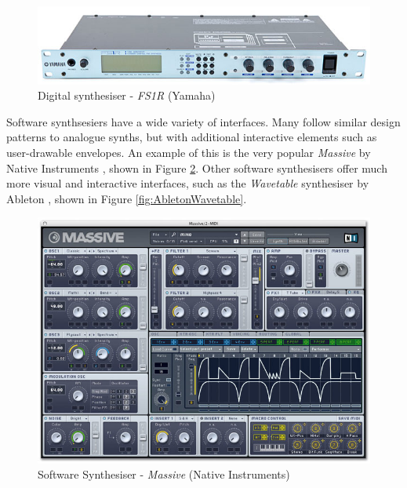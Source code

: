 \documentclass[11pt, oneside]{report}   	%
\begin{document}
%
\begin{figure}[h] 
	\centering
	\includegraphics[width = 6in]{yamaha_fs1r.jpg}
	\caption{Digital synthesiser - \emph{FS1R} (Yamaha) \cite{YamahaFS1R}}
	\label{fig:YamahFS1R}
\end{figure}
Software synthsesiers have a wide variety of interfaces. Many follow similar design patterns to analogue synths, but with additional interactive elements such as user-drawable envelopes. An example of this is the very popular \emph{Massive} by Native Instruments \cite{Massive}, shown in Figure \ref{fig:MassiveNI}. Other software synthesisers offer much more visual and interactive interfaces, such as the \emph{Wavetable} synthesiser by Ableton \cite{Wavetable}, shown in Figure \ref{fig:AbletonWavetable}.

\begin{figure}[h] 
	\centering
	\includegraphics[width = 6in]{MassiveNI.jpg}
	\caption{Software Synthesiser - \emph{Massive} (Native Instruments) \cite{Massive}}
	\label{fig:MassiveNI}
\end{figure}
\end{document}
